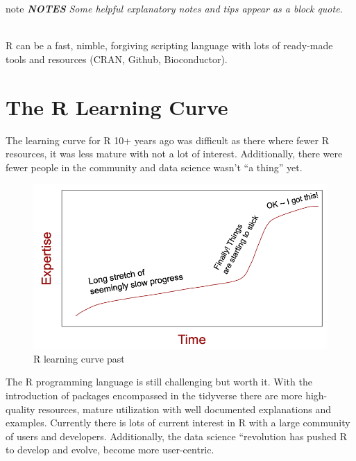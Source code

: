 \documentclass[
]{book}
\begin{document}
\begin{infobox}{note}
\emph{\textbf{NOTES} Some helpful explanatory notes and tips appear as a block quote.}\\
\strut \\
R can be a fast, nimble, forgiving scripting language with lots of ready-made tools and resources (CRAN, Github, Bioconductor).

\end{infobox}

\hypertarget{the-r-learning-curve}{%
\section*{The R Learning Curve}\label{the-r-learning-curve}}

The learning curve for R 10+ years ago was difficult as there where fewer R resources, it was less mature with not a lot of interest. Additionally, there were fewer people in the community and data science wasn't ``a thing'' yet.

\begin{figure}

{\centering \includegraphics[width=11.21in]{images/01_001_r_learning_curve_past} 

}

\caption{\label{fig:1001}R learning curve past}\label{fig:1001}
\end{figure}

The R programming language is still challenging but worth it. With the introduction of packages encompassed in the tidyverse there are more high-quality resources, mature utilization with well documented explanations and examples. Currently there is lots of current interest in R with a large community of users and developers. Additionally, the data science ``revolution has pushed R to develop and evolve, become more user-centric.
\end{document}
